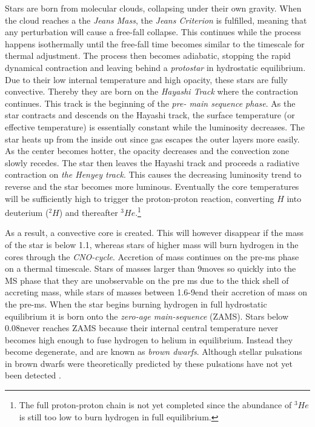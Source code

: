 Stars are born from molecular clouds, collapsing under their own gravity. When the cloud reaches a the \textit{Jeans Mass}, the \textit{Jeans Criterion} is fulfilled, meaning that any perturbation will cause a free-fall collapse. This continues while the process happens isothermally until the free-fall time becomes similar to the timescale for thermal adjustment. The process then becomes adiabatic, stopping the rapid dynamical contraction and leaving behind a \textit{protostar} in hydrostatic equilibrium. Due to their low internal temperature and high opacity, these stars are fully convective. Thereby they are born on the \textit{Hayashi Track} where the contraction continues. This track is the beginning of the \textit{pre- main sequence phase}. As the star contracts and descends on the Hayashi track, the surface temperature (or effective temperature) is essentially constant while the luminosity decreases. The star heats up from the inside out since gas escapes the outer layers more easily. As the center becomes hotter, the opacity decreases and the convection zone slowly recedes. The star then leaves the Hayashi track and proceeds a radiative contraction on \textit{the Henyey track}. This causes the decreasing luminosity trend to reverse and the star becomes more luminous. Eventually the core temperatures will be sufficiently high to trigger the proton-proton reaction, converting $H$ into deuterium ($^{2}H$) and thereafter $^3He$.\footnote{The full proton-proton chain is not yet completed since the abundance of $^3He$ is still too low to burn hydrogen in full equilibrium.} 


As a result, a convective core is created. This will however disappear if the mass of the star is below 1.1\msun, whereas stars of higher mass will burn hydrogen in the cores through the \textit{CNO-cycle}. Accretion of mass continues on the pre-ms phase on a thermal timescale. Stars of masses larger than 9\msun moves so quickly into the MS phase that they are unobservable on the pre ms due to the thick shell of accreting mass, while stars of masses between 1.6-9\msun end their accretion of mass on the pre-ms. When the star begins burning hydrogen in full hydrostatic equilibrium it is born onto the \textit{zero-age main-sequence} (ZAMS). Stars below 0.08\msun never reaches ZAMS because their internal central temperature never becomes high enough to fuse hydrogen to helium in equilibrium. Instead they become degenerate, and are known as \textit{brown dwarfs}. Although stellar pulsations in brown dwarfs were theoretically predicted by \citet{palla2005pulsating} these pulsations have not yet been detected \citep{aerts2010, cody2014pulsation}. 

